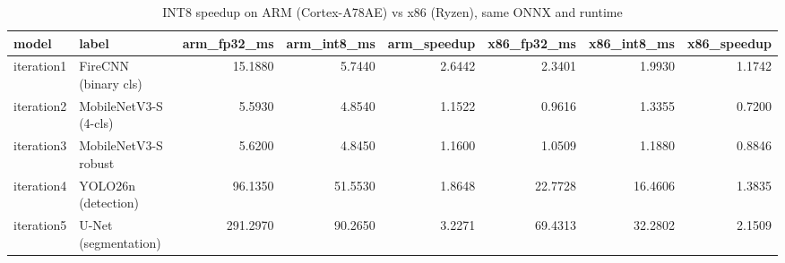 \begin{table}
\caption{INT8 speedup on ARM (Cortex-A78AE) vs x86 (Ryzen), same ONNX and runtime}
\begin{tabular}{llrrrrrr}
\toprule
model & label & arm\_fp32\_ms & arm\_int8\_ms & arm\_speedup & x86\_fp32\_ms & x86\_int8\_ms & x86\_speedup \\
\midrule
iteration1 & FireCNN (binary cls) & 15.1880 & 5.7440 & 2.6442 & 2.3401 & 1.9930 & 1.1742 \\
iteration2 & MobileNetV3-S (4-cls) & 5.5930 & 4.8540 & 1.1522 & 0.9616 & 1.3355 & 0.7200 \\
iteration3 & MobileNetV3-S robust & 5.6200 & 4.8450 & 1.1600 & 1.0509 & 1.1880 & 0.8846 \\
iteration4 & YOLO26n (detection) & 96.1350 & 51.5530 & 1.8648 & 22.7728 & 16.4606 & 1.3835 \\
iteration5 & U-Net (segmentation) & 291.2970 & 90.2650 & 3.2271 & 69.4313 & 32.2802 & 2.1509 \\
\bottomrule
\end{tabular}
\end{table}
